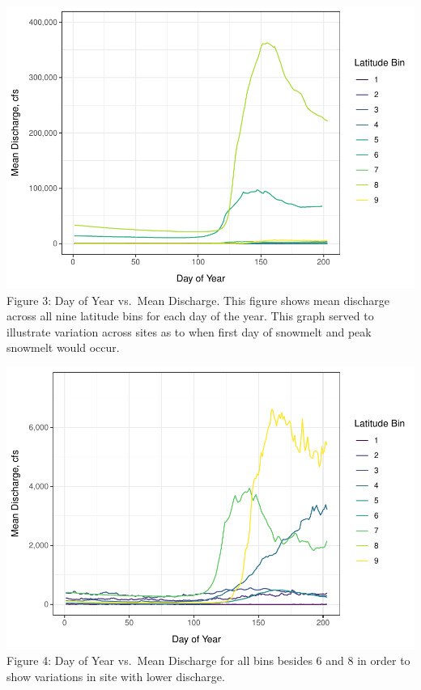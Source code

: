 \documentclass[12pt,]{article}
\begin{document}
\includegraphics{Project_Report_v2_files/figure-latex/Snowmelt Day of Year Exploratory Graph 1-1.pdf}
Figure 3: Day of Year vs.~Mean Discharge. This figure shows mean
discharge across all nine latitude bins for each day of the year. This
graph served to illustrate variation across sites as to when first day
of snowmelt and peak snowmelt would occur.

\includegraphics{Project_Report_v2_files/figure-latex/Snowmelt Day of Year Exploratory Graph 2-1.pdf}
Figure 4: Day of Year vs.~Mean Discharge for all bins besides 6 and 8 in
order to show variations in site with lower discharge.
\end{document}
